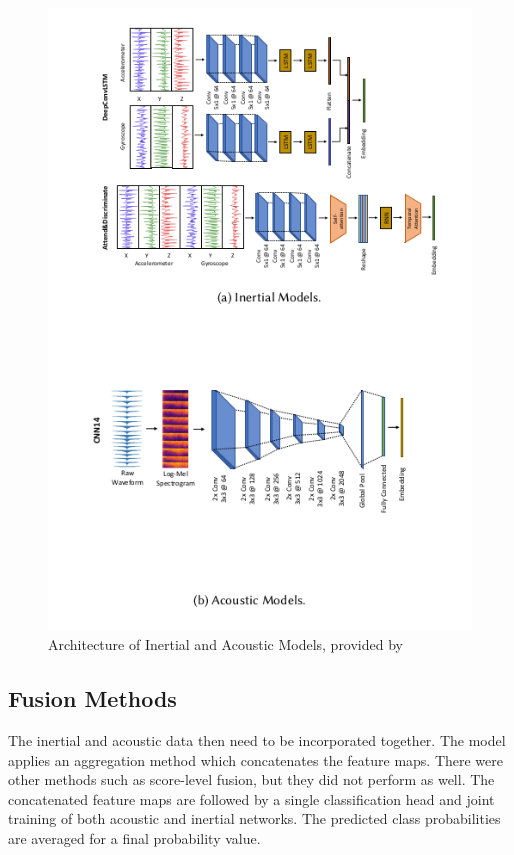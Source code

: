 \documentclass[conference]{IEEEtran}
\begin{document}
	\begin{figure}[h]
		\centering
		\includegraphics[scale=0.50]{Architecture_of_Inertial_and_Acoustic_Models}
		\caption{Architecture of Inertial and Acoustic Models, provided by \cite{2022_Leveraging_sound}}
		\label{fig: Architecture_of_Inertial_and_Acoustic_Models}
	\end{figure}
	
	\subsection{Fusion Methods}
	The inertial and acoustic data then need to be incorporated together. The model applies an aggregation method which concatenates the feature maps. There were other methods such as score-level fusion, but they did not perform as well. The concatenated feature maps are followed by a single classification head and joint training of both acoustic and inertial networks. The predicted class probabilities are averaged for a final probability value.
	
\end{document}
